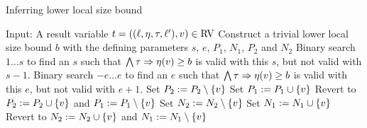 \begin{algorithm}
\caption{Inferring lower local size bound}\label{llsb_algorithm}
\begin{algorithmic}[1]
  \State Input: A result variable $t = ((\ell,\eta,\tau,\ell'),v) \in \text{RV}$
  \State Construct a trivial lower local size bound $b$ with the defining parameters $s$, $e$, $P_1$, $N_1$, $P_2$ and $N_2$
  \State Binary search $1 \dots s$ to find an $s$ such that $\bigwedge \tau \Rightarrow \eta(v) \geq b$ is valid with this $s$, but not valid with $s-1$.
  \State Binary search $-e \dots e$ to find an $e$ such that $\bigwedge \tau \Rightarrow \eta(v) \geq b$ is valid with this $e$, but not valid with $e+1$.
    \State Set $P_2 := P_2 \setminus \lbrace v \rbrace$
      \State Set $P_1 := P_1 \cup \lbrace v \rbrace$
        \State Revert to $P_2 := P_2 \cup \lbrace v \rbrace$ and $P_1 := P_1 \setminus \lbrace v \rbrace$
      \EndIf
    \EndIf
    \State Set $N_2 := N_2 \setminus \lbrace v \rbrace$
      \State Set $N_1 := N_1 \cup \lbrace v \rbrace$
        \State Revert to $N_2 := N_2 \cup \lbrace v \rbrace$ and $N_1 := N_1 \setminus \lbrace v \rbrace$
      \EndIf
    \EndIf
  \EndFor
\end{algorithmic}
\end{algorithm}

